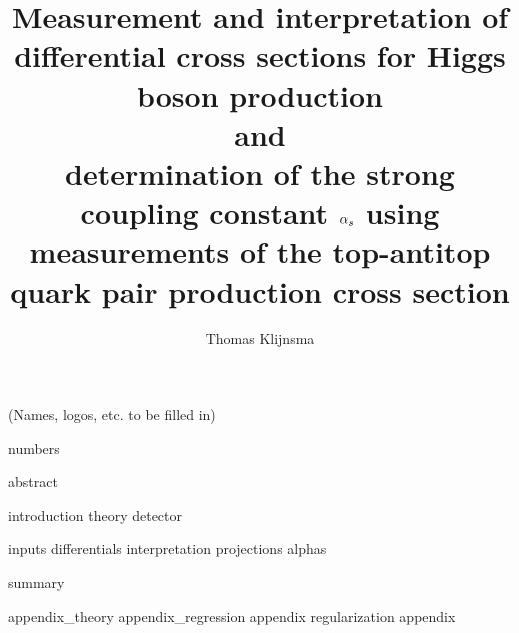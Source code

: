 \documentclass[draftmode]{main}
\begin{document}
\title{%
Measurement and interpretation of differential cross sections for Higgs boson production
\\
and
\\
determination of the strong coupling constant $\alpha_s$ using measurements of the top-antitop quark pair production cross section
}

\author{Thomas Klijnsma}
\maketitle
\thispagestyle{empty}

\begin{center}
(Names, logos, etc. to be filled in)    
\end{center}

\null\newpage\thispagestyle{empty}\null

{numbers}

{abstract}

\tableofcontents

{introduction}
{theory}
{detector}

{inputs}
{differentials}
{interpretation}
{projections}
{alphas}

{summary}




\appendix
{appendix_theory}
{appendix_regression}
{appendix}
{regularization}
{appendix}
\end{document}
